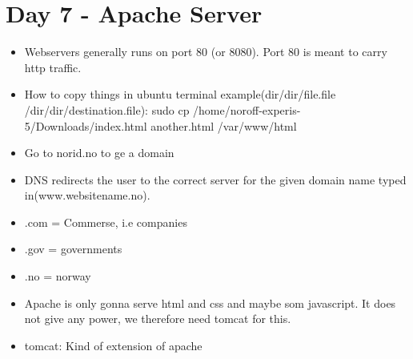 \documentclass[]{article}
\begin{document}
\section{Day 7 - Apache Server}
\begin{itemize}
	\item Webservers generally runs on port 80 (or 8080). Port 80 is meant to carry http traffic.
	\item How to copy things in ubuntu terminal example(dir/dir/file.file /dir/dir/destination.file): sudo cp /home/noroff-experis-5/Downloads/index.html another.html /var/www/html
	\item Go to norid.no to ge a domain
	\item DNS redirects the user to the correct server for the given domain name typed in(www.websitename.no).
	\item .com = Commerse, i.e companies
	\item .gov = governments
	\item .no = norway 
	\item Apache is only gonna serve html and css and maybe som javascript. It does not give any power, we therefore need tomcat for this.
	\item tomcat: Kind of extension of apache
\end{itemize}
\end{document}
